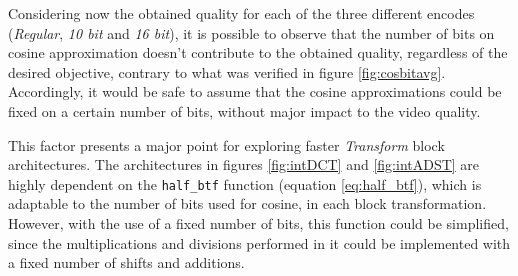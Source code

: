 Considering now the obtained quality for each of the three different encodes (\emph{Regular}, \emph{10 bit} and \emph{16 bit}), it is possible to observe that the number of bits on cosine approximation doesn't contribute to the obtained quality, regardless of the desired objective, contrary to what was verified in figure \ref{fig:cosbitavg}. Accordingly, it would be safe to assume that the cosine approximations could be fixed on a certain number of bits, without major impact to the video quality.

This factor presents a major point for exploring faster \emph{Transform} block architectures. The architectures in figures \ref{fig:intDCT} and \ref{fig:intADST} are highly dependent on the \texttt{half\_btf} function (equation \ref{eq:half_btf}), which is adaptable to the number of bits used for cosine, in each block transformation. However, with the use of a fixed number of bits, this function could be simplified, since the multiplications and divisions performed in it could be implemented with a fixed number of shifts and additions.



\clearpage
\printbibliography[heading=subbibliography]
